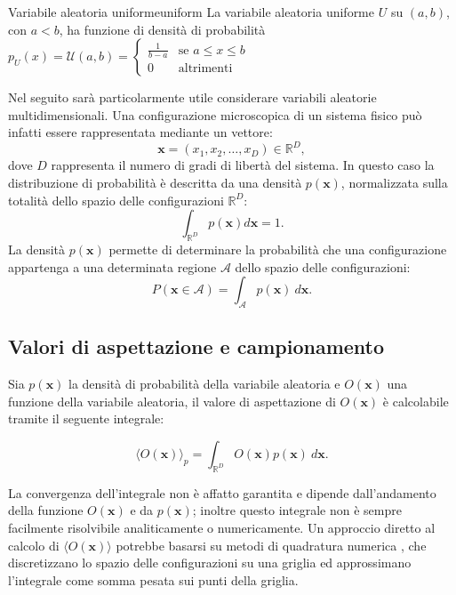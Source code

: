 \begin{example}{Variabile aleatoria uniforme}{uniform}
La variabile aleatoria uniforme $U$ su $(a, b)$, con $a < b$, ha funzione di densità di probabilità
$p_U(x) = \mathcal{U}(a,b) = \begin{cases}
\frac{1}{b-a} & \text{se } a \leq x \leq b \\
0 & \text{altrimenti}
\end{cases}$
\end{example}

Nel seguito sarà particolarmente utile considerare variabili aleatorie multidimensionali. Una configurazione microscopica di un sistema fisico può infatti essere rappresentata mediante un vettore:
\begin{equation}
\mathbf{x}=(x_1,x_2,\ldots,x_D)\in\mathbb{R}^D,
\end{equation}
dove $D$ rappresenta il numero di gradi di libertà del sistema. In questo caso la distribuzione di probabilità è descritta da una densità $p(\mathbf{x})$, normalizzata sulla totalità dello spazio delle configurazioni $\mathbb{R}^D$:
\begin{equation}
\int_{\mathbb{R}^D}p(\mathbf{x})d\mathbf{x}=1.
\end{equation}
La densità $p(\mathbf{x})$ permette di determinare la probabilità che una configurazione appartenga a una determinata regione $\mathcal{A}$ dello spazio delle configurazioni:
\begin{equation}
P(\mathbf{x}\in\mathcal{A})
=
\int_{\mathcal{A}}p(\mathbf{x}) \ d\mathbf{x}.
\end{equation}

\subsection{Valori di aspettazione e campionamento}

Sia $p(\mathbf{x})$ la densità di probabilità della variabile aleatoria e $O(\mathbf{x})$ una funzione della variabile aleatoria, il valore di aspettazione di $O(\mathbf{x})$ è calcolabile tramite il seguente integrale:

\begin{equation}
\langle O(\mathbf{x})\rangle_p=\int_{\mathbb{R}^D} O(\mathbf{x})p(\mathbf{x}) \ d\mathbf{x}.
\end{equation}

La convergenza dell'integrale non è affatto garantita e dipende dall'andamento della funzione $O(\mathbf{x})$ e da $p(\mathbf{x})$; inoltre questo integrale non è sempre facilmente risolvibile analiticamente o numericamente.
Un approccio diretto al calcolo di $\langle O(\mathbf{x})\rangle$ potrebbe basarsi su metodi di quadratura numerica \cite{marinari2023calcolo}, che discretizzano lo spazio delle configurazioni su una griglia ed approssimano l'integrale come somma pesata sui punti della griglia.

